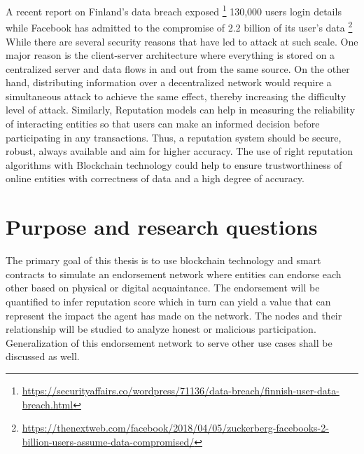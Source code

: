 A recent report on Finland's data breach exposed
\footnote{\url{https://securityaffairs.co/wordpress/71136/data-breach/finnish-user-data-breach.html}}
130,000 users login details while Facebook has admitted to the compromise of
2.2 billion of its user's
data \footnote{\url{https://thenextweb.com/facebook/2018/04/05/zuckerberg-facebooks-2-billion-users-assume-data-compromised/}}
While there are several security reasons that have led to attack at such scale.
One major reason is the client-server architecture where everything is stored
on a centralized server and data flows in and out from the same source. On the
other hand, distributing information over a decentralized network would require
a simultaneous attack to achieve the same effect, thereby increasing the
difficulty level of attack. Similarly, Reputation models can help in measuring
the reliability of interacting entities so that users can make an informed
decision before participating in any transactions. Thus, a reputation system
should be secure, robust, always available and aim for higher accuracy. The use
of right reputation algorithms with Blockchain technology could help to ensure
trustworthiness of online entities with correctness of data and a high degree
of accuracy.  


\section{Purpose and research questions} \label{ResearchQuestions}

The primary goal of this thesis is to use blockchain technology and smart
contracts to simulate an endorsement network where entities can endorse each
other based on physical or digital acquaintance. The endorsement will be
quantified to infer reputation score which in turn can yield a value that can
represent the impact the agent has made on the network.  The nodes and their
relationship will be studied to analyze honest or malicious participation.
Generalization of this endorsement network to serve other use cases shall be
discussed as well. 

